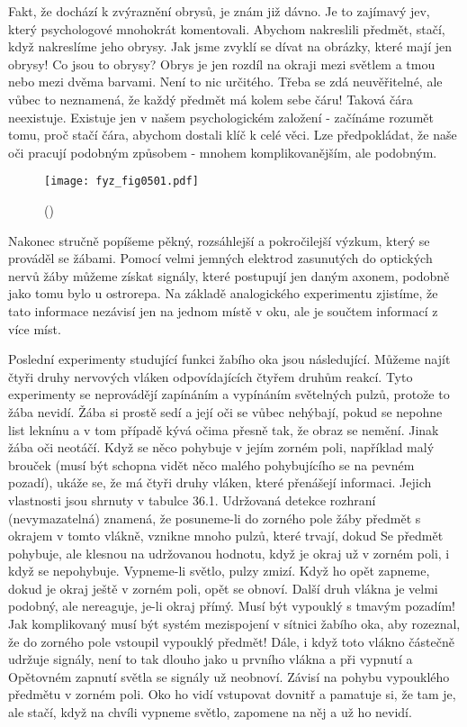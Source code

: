     Fakt, že dochází k zvýraznění obrysů, je znám již dávno. Je to zajímavý jev, který psychologové
    mnohokrát komentovali. Abychom nakreslili předmět, stačí, když nakreslíme jeho obrysy. Jak jsme
    zvyklí se dívat na obrázky, které mají jen obrysy! Co jsou to obrysy? Obrys je jen rozdíl na
    okraji mezi světlem a tmou nebo mezi dvěma barvami. Není to nic určitého. Třeba se zdá
    neuvěřitelné, ale vůbec to neznamená, že každý předmět má kolem sebe čáru! Taková čára
    neexistuje. Existuje jen v našem psychologickém založení - začínáme rozumět tomu, proč stačí
    čára, abychom dostali klíč k celé věci. Lze předpokládat, že naše oči pracují podobným způsobem
    - mnohem komplikovanějším, ale podobným.

    \begin{figure}[ht!] %
      \centering
      \texttt{[image: fyz\_fig0501.pdf]}
      \caption{
              (\cite[s.~697]{Feynman01})}
      \label{fyz:fig0501}
    \end{figure}

    Nakonec stručně popíšeme pěkný, rozsáhlejší a pokročilejší výzkum, který se prováděl se žábami.
    Pomocí velmi jemných elektrod zasunutých do optických nervů žáby můžeme získat signály, které
    postupují jen daným axonem, podobně jako tomu bylo u ostrorepa. Na základě analogického
    experimentu zjistíme, že tato informace nezávisí jen na jednom místě v oku, ale je součtem
    informací z více míst.
    
    Poslední experimenty studující funkci žabího oka jsou následující. Můžeme najít čtyři druhy
    nervových vláken odpovídajících čtyřem druhům reakcí. Tyto experimenty se neprovádějí zapínáním
    a vypínáním světelných pulzů, protože to žába nevidí. Žába si prostě sedí a její oči se vůbec
    nehýbají, pokud se nepohne list leknínu a v tom případě kývá očima přesně tak, že obraz se
    nemění. Jinak žába oči neotáčí. Když se něco pohybuje v jejím zorném poli, například malý
    brouček (musí být schopna vidět něco malého pohybujícího se na pevném pozadí), ukáže se, že má
    čtyři druhy vláken, které přenášejí informaci. Jejich vlastnosti jsou shrnuty v tabulce 36.1.
    Udržovaná detekce rozhraní (nevymazatelná) znamená, že posuneme-li do zorného pole žáby předmět
    s okrajem v tomto vlákně, vznikne mnoho pulzů, které trvají, dokud Se předmět pohybuje, ale
    klesnou na udržovanou hodnotu, když je okraj už v zorném poli, i když se nepohybuje. Vypneme-li
    světlo, pulzy zmizí. Když ho opět zapneme, dokud je okraj ještě v zorném poli, opět se obnoví.
    Další druh vlákna je velmi podobný, ale nereaguje, je-li okraj přímý. Musí být vypouklý s tmavým
    pozadím! Jak komplikovaný musí být systém mezispojení v sítnici žabího oka, aby rozeznal, že do
    zorného pole vstoupil vypouklý předmět! Dále, i když toto vlákno částečně udržuje signály, není
    to tak dlouho jako u prvního vlákna a při vypnutí a Opětovném zapnutí světla se signály už
    neobnoví. Závisí na pohybu vypouklého předmětu v zorném poli. Oko ho vidí vstupovat dovnitř a
    pamatuje si, že tam je, ale stačí, když na chvíli vypneme světlo, zapomene na něj a už ho
    nevidí.

